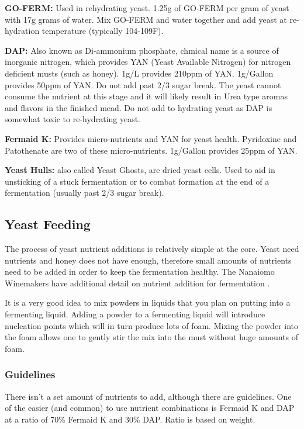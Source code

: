 \documentclass{article}
\begin{document}
  \textbf{GO-FERM:} Used in rehydrating yeast. 1.25g of GO-FERM per gram of yeast with 17g grams of water. Mix GO-FERM and water together  
  and add yeast at re-hydration temperature (typically 104-109F). 

  \textbf{DAP:} Also known as Di-ammonium phosphate, chmical name  is a source of inorganic nitrogen, which provides YAN 
  (Yeast Available Nitrogen) for nitrogen deficient musts (such as honey). 1g/L provides 210ppm of YAN. 1g/Gallon provides 50ppm of YAN. 
  Do not add past 2/3 sugar break. The yeast cannot consume the nutrient at this stage and it will likely result in Urea type aromas and 
  flavors in the finished mead. Do not add to hydrating yeast as DAP is somewhat toxic to re-hydrating yeast.

  \textbf{Fermaid K:} Provides micro-nutrients and YAN for yeast health. Pyridoxine and Patothenate are two of these micro-nutrients. 
  1g/Gallon provides 25ppm of YAN.

  \textbf{Yeast Hulls:} also called Yeast Ghosts, are dried yeast cells. Used to aid in unsticking of a stuck fermentation or to combat 
   formation at the end of a fermentation (usually past 2/3 sugar break).
  
 \subsection{Yeast Feeding}
  The process of yeast nutrient additions is relatively simple at the core. Yeast need nutrients and honey does not have enough, therefore small amounts
  of nutrients need to be added in order to keep the fermentation healthy. The Nanaiomo Winemakers have additional detail on nutrient addition for fermentation
  \cite{nanaiomo-fermentation}. 

  It is a very good idea to mix powders in liquids that you plan on putting into a fermenting liquid. Adding a powder to a fermenting liquid will introduce nucleation
  points which will in turn produce lots of foam. Mixing the powder into the foam allows one to gently stir the mix into the must without huge amounts of foam.
  \subsubsection{Guidelines}
   There isn't a set amount of nutrients to add, although there are guidelines. One of the easier (and common) to use nutrient 
   combinations is Fermaid K and DAP at a ratio of 70\% Fermaid K and 30\% DAP\cite{gotmead-fermaid-ratio}. Ratio is based on weight. 
\end{document}
